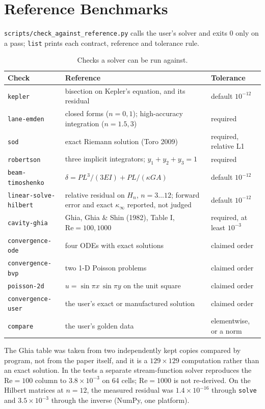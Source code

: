 \documentclass[11pt,a4paper]{report}
\begin{document}
\section{Reference Benchmarks}
\texttt{scripts/check\_against\_reference.py} calls the user's solver and exits 0 only on a pass; \texttt{list} prints each contract, reference and tolerance rule.
\begin{table}[h]
\centering
\small
\begin{tabular}{p{3.5cm}p{7.3cm}p{3.6cm}}
\toprule
\textbf{Check} & \textbf{Reference} & \textbf{Tolerance} \\
\midrule
\texttt{kepler} & bisection on Kepler's equation, and its residual & default $10^{-12}$ \\
\texttt{lane-emden} & closed forms ($n=0,1$); high-accuracy integration ($n=1.5,3$) & required \\
\texttt{sod} & exact Riemann solution (Toro 2009) & required, relative L1 \\
\texttt{robertson} & three implicit integrators; $y_1+y_2+y_3=1$ & required \\
\texttt{beam-timoshenko} & $\delta = PL^3/(3EI) + PL/(\kappa G A)$ & default $10^{-12}$ \\
\texttt{linear-solve-hilbert} & relative residual on $H_n$, $n=3\dots12$; forward error and exact $\kappa_\infty$ reported, not judged & default $10^{-12}$ \\
\texttt{cavity-ghia} & Ghia, Ghia \& Shin (1982), Table I, $\mathrm{Re}=100,1000$ & required, at least $10^{-3}$ \\
\texttt{convergence-ode} & four ODEs with exact solutions & claimed order \\
\texttt{convergence-bvp} & two 1-D Poisson problems & claimed order \\
\texttt{poisson-2d} & $u=\sin\pi x\,\sin\pi y$ on the unit square & claimed order \\
\texttt{convergence-user} & the user's exact or manufactured solution & claimed order \\
\texttt{compare} & the user's golden data & elementwise, or a norm \\
\bottomrule
\end{tabular}
\caption{Checks a solver can be run against.}
\end{table}

The Ghia table was taken from two independently kept copies compared by program, not from the paper itself, and it is a $129\times129$ computation rather than an exact solution. In the tests a separate stream-function solver reproduces the $\mathrm{Re}=100$ column to $3.8\times10^{-3}$ on 64 cells; $\mathrm{Re}=1000$ is not re-derived. On the Hilbert matrices at $n=12$, the measured residual was $1.4\times10^{-16}$ through \texttt{solve} and $3.5\times10^{-3}$ through the inverse (NumPy, one platform).
\end{document}
